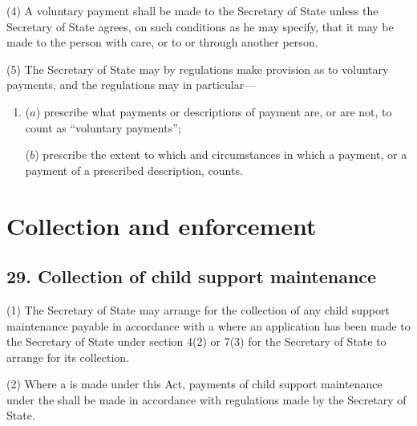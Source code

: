 \documentclass[12pt,a4paper]{article}
\begin{document}
{(4)
A voluntary payment shall be made to the Secretary of State unless the Secretary of State agrees, on such conditions as he may specify, that it may be made to the person with care, or to or through another person.

(5)
The Secretary of State may by regulations make provision as to voluntary payments, and the regulations may in particular---
\begin{enumerate}\item[]
($a$) prescribe what payments or descriptions of payment are, or are not, to count as “voluntary payments”;

($b$) prescribe the extent to which and circumstances in which a payment, or a payment of a prescribed description, counts.
\end{enumerate}

}

\section{Collection and enforcement}

\subsection{29. Collection of child support maintenance}

(1) The Secretary of State may arrange for the collection of any child support maintenance payable in accordance with a  where
an application has been made to the Secretary of State under section 4(2)
or 7(3) for the Secretary of State to arrange for its collection.

(2) Where a  is made under this Act, payments of child support maintenance under the  shall be made in accordance with regulations made by the Secretary of State.
\end{document}
